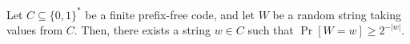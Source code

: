 Let $C \subseteq \{0, 1\}^*$ be a finite prefix-free code, and let $W$ be a random string taking values
from $C$. Then, there exists a string $w \in C$ such that $\Pr[W = w] \ge 2^{-|w|}$.